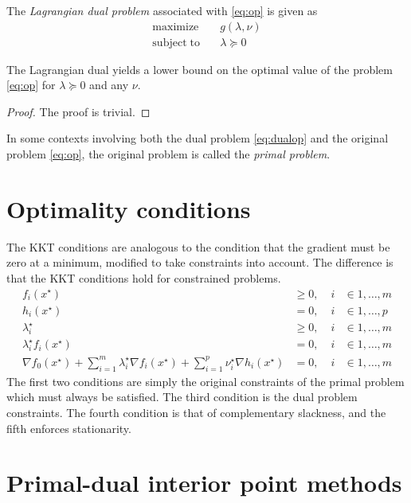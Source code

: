 The \emph{Lagrangian dual problem} associated with \eqref{eq:op} is given as
\begin{align} \label{eq:dualop}
\mathrm{maximize}    \quad & g(\lambda, \nu) \nonumber \\
\mathrm{subject\;to} \quad & \lambda \succeq 0
\end{align}

\begin{theorem}
  The Lagrangian dual yields a lower bound on the optimal value of the problem \eqref{eq:op} for $\lambda \succeq 0$ and any $\nu$.
\end{theorem}
\begin{proof}
  The proof is trivial.
\end{proof}
In some contexts involving both the dual problem \eqref{eq:dualop} and the original problem \eqref{eq:op}, the original problem is called the \emph{primal problem}.

\section{Optimality conditions}
The KKT conditions are analogous to the condition that the gradient must be zero at a minimum, modified to take constraints into account. The difference is that the KKT conditions hold for constrained problems.
\begin{align} \label{eq:kkt}
 f_i(x^\star) & \geq 0, \; & i & \in {1,\dots,m} \nonumber \\
 h_i(x^\star) & = 0, \; & i & \in {1,\dots,p} \nonumber \\
 \lambda_i^\star & \geq 0, \; & i & \in {1,\dots,m} \\
 \lambda_i^\star f_i(x^\star) & = 0, \; & i & \in {1,\dots,m} \nonumber \\
 \nabla f_0(x^\star) + \sum_{i=1}^m \lambda_i^\star \nabla f_i(x^\star)
  + \sum_{i=1}^p \nu_i^\star \nabla h_i(x^\star) & = 0, \; & i & \in {1,\dots,m} \nonumber
\end{align}
The first two conditions are simply the original constraints of the primal problem which must always be satisfied. The third condition is the dual problem constraints. The fourth condition is that of complementary slackness, and the fifth enforces stationarity.

\section{Primal-dual interior point methods}